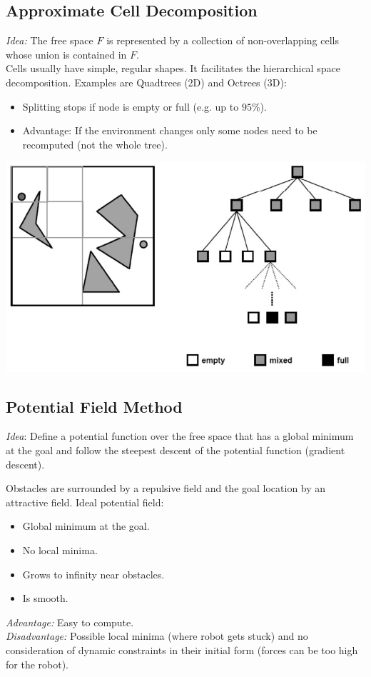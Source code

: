 \begin{multicols*}{2}
\subsection{Approximate Cell Decomposition}
\textit{Idea:} The free space $F$ is represented by a collection of non-overlapping cells whose union is contained in $F$.\\
Cells usually have simple, regular shapes. It facilitates the hierarchical space decomposition.
Examples are Quadtrees (2D) and Octrees (3D):
\begin{itemize}
	\item Splitting stops if node is empty or full (e.g. up to $95\%$).
	\item Advantage: If the environment changes only some nodes need to be recomputed (not the whole tree).
\end{itemize}
\begin{center}
	\includegraphics[width=0.85\columnwidth]{quadtree.jpg}
\end{center}

\subsection{Potential Field Method}
\textit{Idea}: Define a potential function over the free space that has a global minimum at the goal and follow the steepest descent of the potential function (gradient descent).\par
\noindent Obstacles are surrounded by a repulsive field and the goal location by an attractive field. Ideal potential field:
\begin{itemize}
	\item Global minimum at the goal.
	\item No local minima.
	\item Grows to infinity near obstacles.
	\item Is smooth.
\end{itemize}
\textit{Advantage:} Easy to compute.\\
\textit{Disadvantage:} Possible local minima (where robot gets stuck) and no consideration of dynamic constraints in their initial form (forces can be too high for the robot).


\end{multicols*}
